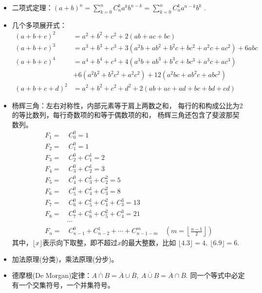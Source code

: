 \begin{itemize}[leftmargin=\inteval{\myitemleftmargin}pt,itemsep=
   \inteval{\myitemitempsep}pt,topsep=\inteval{\myitemtopsep}pt]
\item 二项式定理：$ (a+b)^n=\sum\limits_{k=0}^nC_n^ka^kb^{n-k}=
\sum\limits_{k=0}^nC_n^ka^{n-k}b^k $ .
\item 几个多项展开式：
\begin{align*}
    (a+b+c)^2 &=a^2+b^2+c^2+2(ab+ac+bc) \\
    (a+b+c)^3 &=a^3+b^3+c^3+3(a^2b+ab^2+b^2c+bc^2+a^2c+ac^2)+6abc \\
    (a+b+c)^4 &=a^4+b^4+c^4+4(a^3b+ab^3+b^3c+bc^3+a^3c+ac^3) \\
    &+6(a^2b^2+b^2c^2+a^2c^2)+12(a^2bc+ab^2c+abc^2) \\
    (a+b+c+d)^2 &=a^2+b^2+c^2+d^2+2(ab+ac+ad+bc+bd+cd) 
\end{align*}
\item 杨辉三角：左右对称性，内部元素等于肩上两数之和，
每行的和构成公比为2的等比数列，每行奇数项的和等于偶数项的和，
杨辉三角还包含了斐波那契数列。
\begin{align*}
    F_1=&\  C_0^0=1 \\
    F_2=&\  C_1^0=1 \\
    F_3=&\  C_2^0+C_1^1=2 \\
    F_4=&\  C_3^0+C_2^1=3 \\
    F_5=&\  C_4^0+C_3^1+C_2^2=5 \\
    F_6=&\  C_5^0+C_4^1+C_3^2=8 \\
    F_7=&\  C_6^0+C_5^1+C_4^2+C_3^3=13 \\
    F_8=&\  C_7^0+C_6^1+C_5^2+C_4^3=21 \\ 
    &\cdots \\
    F_n=&\  C_{n-1}^0+C_{n-2}^1+\cdots+C_{n-1-m}^m\quad \left(m=\left\lfloor
    \frac{n-1}{2} \right\rfloor\right)   
\end{align*}
其中，$ \lfloor x \rfloor $表示向下取整，即不超过$ x $的最大整数，比如
$ \lfloor 4.3 \rfloor=4,\ \lfloor 6.9 \rfloor=6 $. 
\item 加法原理(分类)，乘法原理(分步)。
\item 德摩根(De Morgan)定律：$ \overline{A \cap B}=\overline{A}\cup 
\overline{B},\ \overline{A \cup B}=\overline{A}\cap \overline{B} $. 
同一个等式中必定有一个交集符号，一个并集符号。


\end{itemize}
